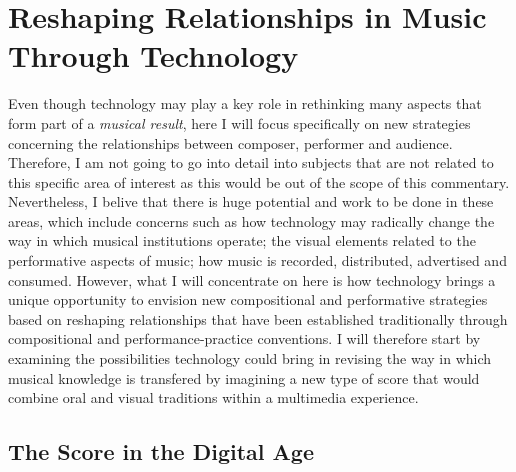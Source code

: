\section{Reshaping Relationships in Music Through Technology}

Even though technology may play a key role in rethinking many aspects that form part of a \emph{musical result}, here I will focus specifically on new strategies concerning the relationships between composer, performer and audience. Therefore, I am not going to go into detail into subjects that are not related to this specific area of interest as this would be out of the scope of this commentary. Nevertheless, I belive that there is huge potential and work to be done in these areas, which include concerns such as how technology may radically change the way in which musical institutions operate; the visual elements related to the performative aspects of music; how music is recorded, distributed, advertised and consumed. However, what I will concentrate on here is how technology brings a unique opportunity to envision new compositional and performative strategies based on reshaping relationships that have been established traditionally through compositional and performance-practice conventions. I will therefore start by examining the possibilities technology could bring in revising the way in which musical knowledge is transfered by imagining a new type of score that would combine oral and visual traditions within a multimedia experience.

\subsection{The Score in the Digital Age}


